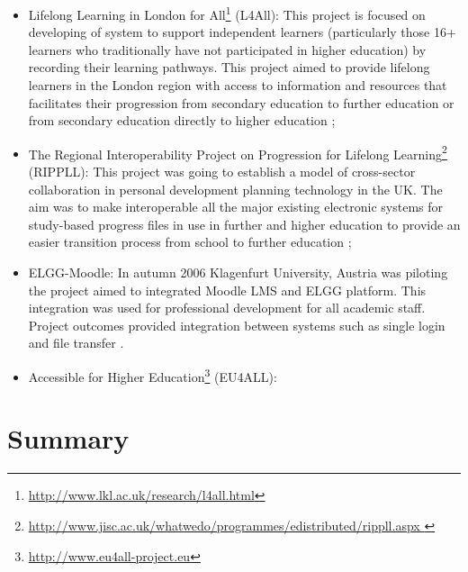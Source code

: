 \begin{itemize}

  \item Lifelong Learning in London for
  All\footnote{\url{http://www.lkl.ac.uk/research/l4all.html}} (L4All): This
  project is focused on developing of \LLLs system to support independent
  learners (particularly those 16+ learners who traditionally have not
  participated in higher education) by recording their learning pathways. This
  project aimed to provide lifelong learners in the London region with access to
  information and resources that facilitates their progression from secondary
  education to further education or from secondary education directly to higher
  education \citep{Freitas2006};

  \item The Regional Interoperability Project on Progression for Lifelong
Learning\footnote{\url{http://www.jisc.ac.uk/whatwedo/programmes/edistributed/rippll.aspx
}} (RIPPLL): This project was going to establish a model of cross-sector
collaboration in personal development planning technology in the UK. The aim was
to make interoperable all the major existing electronic systems for study-based
progress files in use in further and higher education to provide an easier
transition process from school to further education \citep{Hartnell-Young2006};

  \item ELGG-Moodle: In autumn 2006 Klagenfurt University, Austria was piloting
the project aimed to integrated Moodle LMS and ELGG platform. This integration
was used for professional development for all academic staff. Project outcomes
provided integration between systems such as single login and file transfer
\citep{Attwell2007}.

  \item Accessible \LLLc for Higher
Education\footnote{\url{http://www.eu4all-project.eu}} (EU4ALL):
\end{itemize}

\section{Summary}